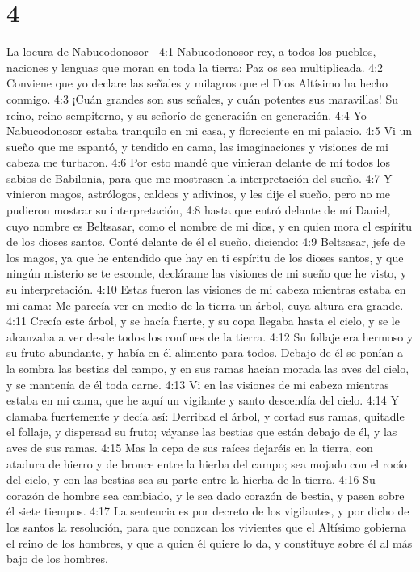 \chapter{4}

La locura de Nabucodonosor  

4:1 Nabucodonosor rey, a todos los pueblos, naciones y lenguas que moran en toda la tierra: Paz os sea multiplicada.  
4:2 Conviene que yo declare las señales y milagros que el Dios Altísimo ha hecho conmigo.  
4:3 ¡Cuán grandes son sus señales, y cuán potentes sus maravillas! Su reino, reino sempiterno, y su señorío de generación en generación.  
4:4 Yo Nabucodonosor estaba tranquilo en mi casa, y floreciente en mi palacio.  
4:5 Vi un sueño que me espantó, y tendido en cama, las imaginaciones y visiones de mi cabeza me turbaron.  
4:6 Por esto mandé que vinieran delante de mí todos los sabios de Babilonia, para que me mostrasen la interpretación del sueño.  
4:7 Y vinieron magos, astrólogos, caldeos y adivinos, y les dije el sueño, pero no me pudieron mostrar su interpretación,  
4:8 hasta que entró delante de mí Daniel, cuyo nombre es Beltsasar, como el nombre de mi dios, y en quien mora el espíritu de los dioses santos. Conté delante de él el sueño, diciendo:  
4:9 Beltsasar, jefe de los magos, ya que he entendido que hay en ti espíritu de los dioses santos, y que ningún misterio se te esconde, declárame las visiones de mi sueño que he visto, y su interpretación.  
4:10 Estas fueron las visiones de mi cabeza mientras estaba en mi cama: Me parecía ver en medio de la tierra un árbol, cuya altura era grande.  
4:11 Crecía este árbol, y se hacía fuerte, y su copa llegaba hasta el cielo, y se le alcanzaba a ver desde todos los confines de la tierra.  
4:12 Su follaje era hermoso y su fruto abundante, y había en él alimento para todos. Debajo de él se ponían a la sombra las bestias del campo, y en sus ramas hacían morada las aves del cielo, y se mantenía de él toda carne.  
4:13 Vi en las visiones de mi cabeza mientras estaba en mi cama, que he aquí un vigilante y santo descendía del cielo.  
4:14 Y clamaba fuertemente y decía así: Derribad el árbol, y cortad sus ramas, quitadle el follaje, y dispersad su fruto; váyanse las bestias que están debajo de él, y las aves de sus ramas.  
4:15 Mas la cepa de sus raíces dejaréis en la tierra, con atadura de hierro y de bronce entre la hierba del campo; sea mojado con el rocío del cielo, y con las bestias sea su parte entre la hierba de la tierra.  
4:16 Su corazón de hombre sea cambiado, y le sea dado corazón de bestia, y pasen sobre él siete tiempos.  
4:17 La sentencia es por decreto de los vigilantes, y por dicho de los santos la resolución, para que conozcan los vivientes que el Altísimo gobierna el reino de los hombres, y que a quien él quiere lo da, y constituye sobre él al más bajo de los hombres.  
